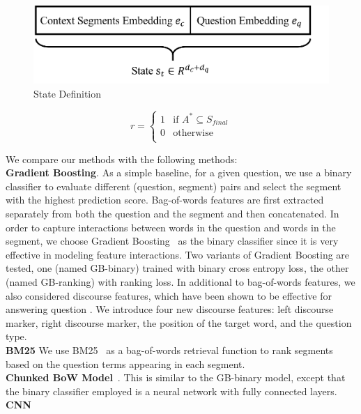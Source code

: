 \begin{figure}
\begin{minipage}{.49\textwidth}
  \centering
  \includegraphics[width=0.9\linewidth]{fig/fig4.png}
  \caption{State Definition}
  \label{fig:state}
\end{minipage}
\end{figure}

\begin{equation}
r=
    \begin{cases}
      1 & \text{if $A^* \subseteq S_{final}$}\\
     0 & \text{otherwise}\\
    \end{cases}
\end{equation}

We compare our methods with the following methods: \\
\textbf{Gradient Boosting}. As a simple baseline, for a given question, we use a binary classifier to evaluate  different (question, segment) pairs and select the segment with the highest prediction score. Bag-of-words features are first extracted separately from both the question and the segment and then concatenated. In order to capture interactions between words in the question and words in the segment, we choose Gradient Boosting~\cite{friedman2001greedy} as the binary classifier since it is very effective in modeling feature interactions. Two variants of Gradient Boosting are tested, one (named GB-binary) trained with binary cross entropy loss, the other (named GB-ranking) with ranking loss. In additional to bag-of-words features, we also considered discourse features, which have been shown to be effective for answering question \cite{DBLP:conf/acl/JansenSC14,DBLP:conf/acl/NarasimhanB15}. We introduce four new discourse features: left discourse marker, right discourse marker, the position of the target word, and the question type.\\
\textbf{BM25} We use BM25~\cite{DBLP:journals/ftir/RobertsonZ09} as a bag-of-words retrieval function to rank segments based on the question terms appearing in each segment.\\
\textbf{Chunked BoW Model}~\cite{DBLP:conf/acl/ChoiHUPLB17}. This is similar to the GB-binary model, except that the binary classifier employed is a neural network with fully connected layers.\\
\textbf{CNN}~\cite{DBLP:conf/acl/ChoiHUPLB17} 

